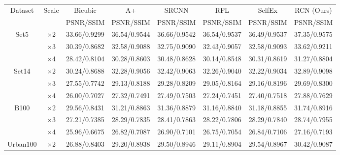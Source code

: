 \documentclass[10pt,twocolumn,letterpaper]{article}
\begin{document}
\begin{table}
\begin{center}
\setlength{\tabcolsep}{2pt}
\footnotesize
\begin{tabular}{ | c | c | c | c | c | c | c | c | }
\hline
\multirow{2}{*}{Dataset} & \multirow{2}{*}{Scale} & Bicubic & A+ & SRCNN & RFL & SelfEx & RCN (Ours)\\
 & & PSNR/SSIM & PSNR/SSIM & PSNR/SSIM & PSNR/SSIM & PSNR/SSIM & PSNR/SSIM\\
\hline
\hline
\multirow{3}{*}{Set5} & $\times$2 & 33.66/0.9299 & 36.54/{\color{blue}0.9544} & {\color{blue}36.66}/0.9542 & 36.54/0.9537 & 36.49/0.9537 & {\color{red}37.35}/{\color{red}0.9575}\\
 & $\times$3 & 30.39/0.8682 & 32.58/0.9088 & {\color{blue}32.75}/0.9090 & 32.43/0.9057 & 32.58/{\color{blue}0.9093} & {\color{red}33.62}/{\color{red}0.9211}\\
 & $\times$4 & 28.42/0.8104 & 30.28/0.8603 & {\color{blue}30.48}/{\color{blue}0.8628} & 30.14/0.8548 & 30.31/0.8619 & {\color{red}31.27}/{\color{red}0.8804}\\
\hline
\hline
\multirow{3}{*}{Set14} & $\times$2 & 30.24/0.8688 & 32.28/0.9056 & {\color{blue}32.42}/{\color{blue}0.9063} & 32.26/0.9040 & 32.22/0.9034 & {\color{red}32.89}/{\color{red}0.9098}\\
 & $\times$3 & 27.55/0.7742 & 29.13/0.8188 & {\color{blue}29.28}/{\color{blue}0.8209} & 29.05/0.8164 & 29.16/0.8196 & {\color{red}29.69}/{\color{red}0.8300}\\
 & $\times$4 & 26.00/0.7027 & 27.32/0.7491 & {\color{blue}27.49}/0.7503 & 27.24/0.7451 & 27.40/{\color{blue}0.7518} & {\color{red}27.88}/{\color{red}0.7629}\\
\hline
\hline
\multirow{3}{*}{B100} & $\times$2 & 29.56/0.8431 & 31.21/0.8863 & {\color{blue}31.36}/{\color{blue}0.8879} & 31.16/0.8840 & 31.18/0.8855 & {\color{red}31.74}/{\color{red}0.8916}\\
 & $\times$3 & 27.21/0.7385 & 28.29/0.7835 & {\color{blue}28.41}/{\color{blue}0.7863} & 28.22/0.7806 & 28.29/0.7840 & {\color{red}28.74}/{\color{red}0.7955}\\
 & $\times$4 & 25.96/0.6675 & 26.82/0.7087 & {\color{blue}26.90}/0.7101 & 26.75/0.7054 & 26.84/{\color{blue}0.7106} & {\color{red}27.16}/{\color{red}0.7193}\\
\hline
\hline
\multirow{3}{*}{Urban100} & $\times$2 & 26.88/0.8403 & 29.20/0.8938 & 29.50/0.8946 & 29.11/0.8904 & {\color{blue}29.54}/{\color{blue}0.8967} & {\color{red}30.42}/{\color{red}0.9087}\\

\end{tabular}
\end{center}
\end{table}
\end{document}
